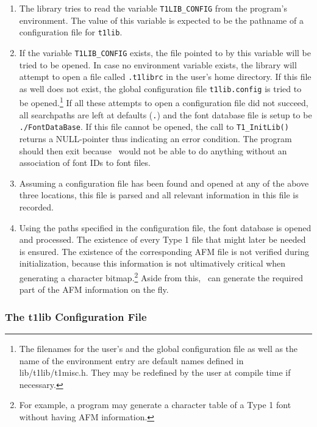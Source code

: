 \begin{enumerate}
\item The library tries to read the variable \verb+T1LIB_CONFIG+ from
  the program's environment.
  The value of this variable is expected to be the
  pathname of a configuration file for \verb+t1lib+. 
\item If the variable \verb+T1LIB_CONFIG+ exists, the file pointed to
  by this variable will be tried to be opened. In case no environment
  variable exists, the library will attempt to open a file called
  \verb+.t1librc+ in the user's home directory.
  If this file as well does
  not exist, the global configuration file \verb+t1lib.config+ is tried to be
  opened.\footnote{The filenames for the user's and the global configuration
    file as well as the name of the environment entry are default names 
    defined in {\ttfamily lib/t1lib/t1misc.h}. They may be redefined by the
    user at compile time if necessary.}
  If all these attempts to open a configuration file did not
  succeed, all searchpaths are left at defaults (\verb+.+) and the font database
  file is  setup to be \verb+./FontDataBase+. If this file cannot be
  opened, the call to \verb+T1_InitLib()+ returns a NULL-pointer thus
  indicating an error condition. The program should then exit because
  \tonelib\ would not be able to do anything without an association of font
  IDs to font files.
\item Assuming a configuration file has been found and opened at any of the
  above three locations, this file
  is parsed and all relevant information in this file is recorded.
\item Using the paths specified in the configuration file, the
  font database is opened and processed. The existence of every Type 1
  file that might later be needed is ensured. The existence of the
  corresponding AFM file is not verified during
  initialization, because this information is not ultimatively
  critical when generating a character bitmap.\footnote{For example, a
    program may generate a character table of a Type 1 font without
    having AFM information.} Aside from this, \tonelib\ can generate the
  required part of the AFM information on the fly.
\end{enumerate}


\subsubsection{The {\ttfamily t1lib} Configuration File}
\label{subsubsec:configfile}

